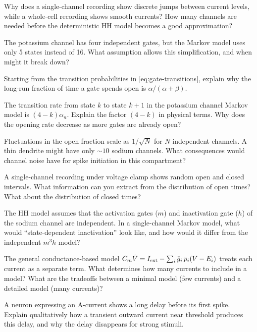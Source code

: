 \begin{conceptquestions}
  \item Why does a single-channel recording show discrete jumps between current levels, while a whole-cell recording shows smooth currents? How many channels are needed before the deterministic HH model becomes a good approximation?

  \item The potassium channel has four independent gates, but the Markov model uses only 5 states instead of 16. What assumption allows this simplification, and when might it break down?

  \item Starting from the transition probabilities in \cref{eq:gate-transitions}, explain why the long-run fraction of time a gate spends open is $\alpha/(\alpha + \beta)$.

  \item The transition rate from state $k$ to state $k+1$ in the potassium channel Markov model is $(4-k)\alpha_n$. Explain the factor $(4-k)$ in physical terms. Why does the opening rate decrease as more gates are already open?

  \item Fluctuations in the open fraction scale as $1/\sqrt{N}$ for $N$ independent channels. A thin dendrite might have only $\sim 10$ sodium channels. What consequences would channel noise have for spike initiation in this compartment?

  \item A single-channel recording under voltage clamp shows random open and closed intervals. What information can you extract from the distribution of open times? What about the distribution of closed times?

  \item The HH model assumes that the activation gates ($m$) and inactivation gate ($h$) of the sodium channel are independent. In a single-channel Markov model, what would ``state-dependent inactivation'' look like, and how would it differ from the independent $m^3 h$ model?

  \item The general conductance-based model $C_m\dot{V} = I_{\text{ext}} - \sum_i \bar{g}_i\, p_i(V - E_i)$ treats each current as a separate term. What determines how many currents to include in a model? What are the tradeoffs between a minimal model (few currents) and a detailed model (many currents)?

  \item A neuron expressing an A-current shows a long delay before its first spike. Explain qualitatively how a transient outward current near threshold produces this delay, and why the delay disappears for strong stimuli.


\end{conceptquestions}
